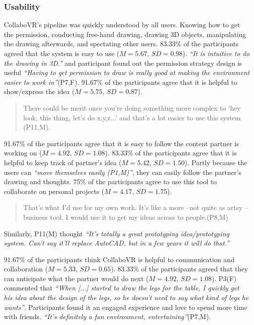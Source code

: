 \documentclass{sigchi}
\begin{document}
\subsubsection{Usability}
CollaboVR's pipeline was quickly understood by all users. Knowing how to get the permission, conducting free-hand drawing, drawing 3D objects, manipulating the drawing afterwards, and spectating other users. 83.33\% of the participants agreed that the system is easy to use ($M=5.67$, $SD=0.98$). \textit{``It is intuitive to do the drawing in 3D.''} and participant found out the permission strategy design is useful \textit{``Having to get permission to draw is really good at making the environment easier to work in''}(P7,F).
91.67\% of the participants agree that it is helpful to show/express the idea ($M=5.75$, $SD=0.87$). 
\begin{quote}
    There could be merit once you're doing something more complex to 'hey look, this thing, let's do x,y,z...' and that's a lot easier to use this system (P11,M).    
\end{quote}
91.67\% of the participants agree that it is easy to follow the content partner is working on ($M=4.92$, $SD=1.08$).
83.33\% of the participants agree that it is helpful to keep track of partner's idea ($M=5.42$, $SD=1.50$). Partly because the users can \textit{``move themselves easily (P1,M)''}, they can easily follow the partner's drawing and thoughts.
75\% of the participants agree to use this tool to collaborate on personal projects ($M=4.17$, $SD=1.75$). 
\begin{quote}
    That's what I'd use for my own work. It's like a more --not quite as artsy -- business tool. I would use it to get my ideas across to people.(P8,M)
\end{quote}
Similarly, P11(M) thought \textit{``It's totally a great prototyping idea/prototyping system. Can't say it'll replace AutoCAD, but in a few years it will do that.''}

91.67\% of the participants think CollaboVR is helpful to communication and collaboration ($M=5.33$, $SD=0.65$). 
83.33\% of the participants agreed that they can anticipate what the partner would do next ($M=4.92$, $SD=1.08$). P3(F) commented that \textit{``When [...] started to draw the legs for the table, I quickly get his idea about the design of the legs, so he doesn't need to say what kind of legs he wants''}. Participants found it an engaged experience and love to spend more time with friends. \textit{``It's definitely a fun environment, entertaining''}(P7,M).
\end{document}

